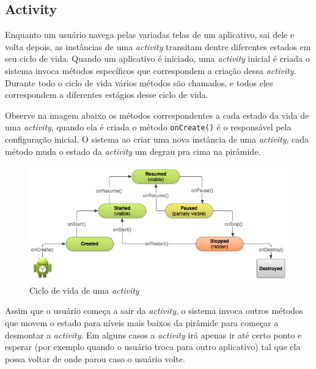 \documentclass[a4paper,12pt,brazil,oneside]{book}
\begin{document}
\begin{singlespace}

\section{Activity}
Enquanto um usuário navega pelas variadas telas de um aplicativo, sai dele e volta depois, as instâncias de uma \emph{activity} transitam dentre diferentes estados em seu ciclo de vida. Quando um aplicativo é iniciado, uma \emph{activity} inicial é criada o sistema invoca métodos específicos que correspondem a criação dessa \emph{activity}. Durante todo o ciclo de vida vários métodos são chamados, e todos eles correspondem a diferentes estágios desse ciclo de vida. 

Observe na imagem abaixo os métodos correspondentes a cada estado da vida de uma \emph{activity}, quando ela é criada o método \texttt{onCreate()} é o responsável pela configuração inicial. O sistema ao criar uma nova instância de uma \emph{activity}, cada método muda o estado da \emph{activity} um degrau pra cima na pirâmide. 

\begin{figure}[H]
  \centering
  \includegraphics[width=1\textwidth]{figuras/design/basic-lifecycle.png}
  \caption{Ciclo de vida de uma \emph{activity} }
  \label{fig:e2}
\end{figure}

Assim que o usuário começa a sair da \emph{activity}, o sistema invoca outros métodos que movem o estado para níveis mais baixos da pirâmide para começar a desmontar a \emph{activity}. Em alguns casos a \emph{activity} irá apenas ir até certo ponto e esperar (por exemplo quando o usuário troca para outro aplicativo) tal que ela possa voltar de onde parou caso o usuário volte. 


\end{singlespace}
\end{document}

